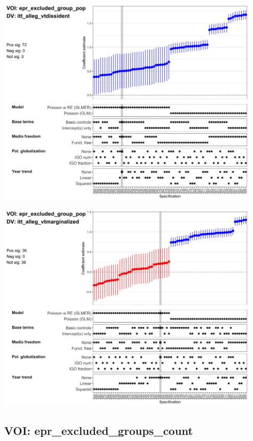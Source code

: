 \documentclass[]{article}
\begin{document}
\includegraphics[height=4in]{../output/figures-robustness/specplot-epr_excluded_group_pop-itt_alleg_vtdissident.png}

\includegraphics[height=4in]{../output/figures-robustness/specplot-epr_excluded_group_pop-itt_alleg_vtmarginalized.png}

\hypertarget{voi-epr_excluded_groups_count}{%
\subsection{VOI:
epr\_excluded\_groups\_count}\label{voi-epr_excluded_groups_count}}
\end{document}
